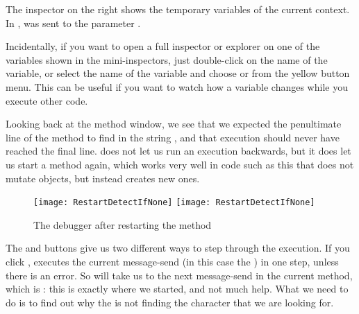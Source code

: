 \documentclass[a4paper,10pt,twoside]{book}
\begin{document}
The inspector on the right shows the temporary variables of the current context.
In ,
 was sent to the parameter .


Incidentally, if you want to open a full inspector or explorer on one of the variables shown in the mini-inspectors, just double-click on the name of the variable, or select the name of the variable and choose  or  from the yellow button menu.  
This can be useful if you want to watch how a variable changes while you execute other code. 

Looking back at the method window, we see that we expected the penultimate line of the method to find  in the string , and that execution should never have reached the final line.
\sq does not let us run an execution backwards, but it does let us start a method again, which works very well in code such as this that does not mutate objects, but instead creates new ones.  


\begin{figure}[btp]
	\begin{center}
	\ifluluelse
		{\texttt{[image: RestartDetectIfNone]}}
		{\texttt{[image: RestartDetectIfNone]}}
	\end{center}
	\caption{The debugger after restarting the  method}
	\label{fig:RestartDetectIfNone}
\end{figure}

The  and  buttons give us two different ways to step through the execution.  If you click , \sq executes the current message-send (in this case the ) in one step, unless there is an error.  
So  will take us to the next message-send in the current method, which is : this is exactly where we started, and not much help. 
What we need to do is to find out why the  is not finding the character that we are looking for.
\end{document}
